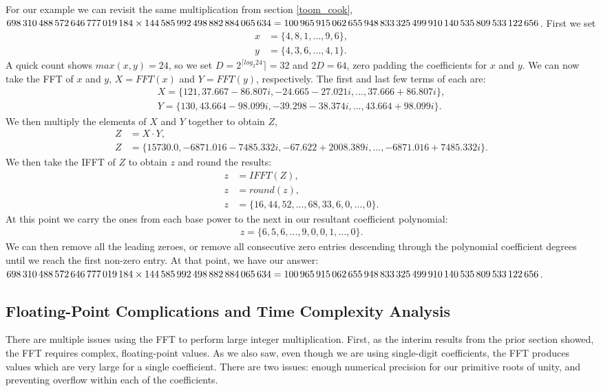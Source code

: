 \documentclass[psamsfonts,reqno]{amsart}
\theoremstyle{definition}
\theoremstyle{remark}
\numberwithin{equation}{section}
\begin{document}
For our example we can revisit the same multiplication from section \ref{toom_cook}, \\
$\num{698310488572646777019184} \times \num{144585992498882884065634} = \\
\num{100965915062655948833325499910140535809533122656}$. First we set 
\begin{align*}
	x &= \{4, 8, 1, ..., 9, 6\}, \\
	y &= \{4, 3, 6, ..., 4, 1\}.
\end{align*}
A quick count shows $max(x,y)=24$, so we set $D= 2^{\lceil log_2 {24}} \rceil = 32$ and $2D = 64$, zero padding the coefficients for $x$ and $y$. We can now take the FFT of $x$ and $y$, $X=FFT(x)$ and $Y = FFT(y)$, respectively. The first and last few terms of each are:
\begin{align*}
	X = \{121, 37.667 -86.807i, -24.665 -27.021i, ..., 37.666 + 86.807i\}, \\
	Y = \{130, 43.664 -98.099i, -39.298 -38.374i, ..., 43.664 + 98.099i\}.
\end{align*}
We then multiply the elements of $X$ and $Y$ together to obtain $Z$, 
\begin{align*}
	Z &= X \cdot Y, \\
	Z &= \{15730.0, -6871.016 -7485.332i, -67.622 +2008.389i, ..., -6871.016 + 7485.332i\}.
\end{align*}
We then take the IFFT of $Z$ to obtain $z$ and round the results:
\begin{align*}
	z &= IFFT(Z), \\
	z &= round(z), \\
	z &= \{16, 44, 52, ..., 68, 33, 6, 0, ..., 0\}.
\end{align*}
At this point we carry the ones from each base power to the next in our resultant coefficient polynomial:
\begin{align*}
	z = \{6, 5, 6, ..., 9, 0, 0, 1, ..., 0\}.
\end{align*}
We can then remove all the leading zeroes, or remove all consecutive zero entries descending through the polynomial coefficient degrees until we reach the first non-zero entry. At that point, we have our answer: \\
$\num{698310488572646777019184} \times \num{144585992498882884065634} = \\
\num{100965915062655948833325499910140535809533122656}$.


\subsection{Floating-Point Complications and Time Complexity Analysis \nopunct} \label{floating_point_complications}
There are multiple issues using the FFT to perform large integer multiplication. First, as the interim results from the prior section showed, the FFT requires complex, floating-point values. As we also saw, even though we are using single-digit coefficients, the FFT produces values which are very large for a single coefficient. There are two issues: enough numerical precision for our primitive roots of unity, and preventing overflow within each of the coefficients. 
\end{document}
